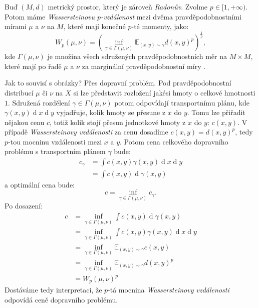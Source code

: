 \documentclass[czech]{article}
\begin{document}
Buď $(M, d)$ metrický prostor, který je zároveň \emph{Radonův}. Zvolme $p \in [1, + \infty)$.
Potom máme \emph{Wassersteinovu $p$-vzdálenost} mezi dvěma pravděpodobnostními mírami $\mu$ a $\nu$ na $M$,
které mají konečné $p$-té momenty,
jako:
\begin{equation}
    W_p (\mu, \nu) = \left( \inf_{\gamma \in \Gamma(\mu, \nu)} \mathbb{E}_{(x, y) \sim \gamma} d(x, y)^p \right)^{\frac{1}{p}},
\end{equation}
kde $\Gamma(\mu, \nu)$ je množina všech sdružených pravděpodobnostních měr na $M \times M$,
které mají po řadě $\mu$ a $\nu$ za marginální pravděpodobnostní míry \cite{vaserstejn}.

Jak to souvisí s obrázky?
Přes dopravní problém.
Pod pravděpodobnostní distribucí $\mu$ či $\nu$ na $X$ si lze představit rozložení jakési hmoty
o celkové hmotnosti $1$.
Sdružená rozdělení $\gamma \in \Gamma(\mu, \nu)$ potom odpovídají transportnímu plánu,
kde $\gamma(x, y) \operatorname{d}x \operatorname{d}y$
vyjadřuje, kolik hmoty se přesune z $x$ do $y$.
Tomu lze přiřadit nějakou cenu $c$,
totiž kolik stojí přesun jednotkové hmoty z $x$ do $y$: $c(x, y)$.
V případě \emph{Wassersteinovy vzdálenosti}
za cenu dosadíme $c(x, y) = d(x, y)^p$,
tedy $p$-tou mocninu vzdálenosti mezi $x$ a $y$.
Potom cena celkového dopravního problému s transportním plánem $\gamma$ bude:
\begin{align}
    c_\gamma &= \int c(x, y) \gamma(x, y) \operatorname{d}x \operatorname{d}y \\
    &= \int c(x, y) \operatorname{d} \gamma(x, y)
\end{align}
a optimální cena bude:
\begin{equation}
    c = \inf_{\gamma \in \Gamma(\mu, \nu)} c_\gamma.
\end{equation}
Po dosazení:
\begin{align}
    c &= \inf_{\gamma \in \Gamma(\mu, \nu)} \int c(x, y) \operatorname{d} \gamma(x, y) \\
    &= \inf_{\gamma \in \Gamma(\mu, \nu)} \int c(x, y) \gamma(x, y) \operatorname{d}x \operatorname{d}y \\
    &= \inf_{\gamma \in \Gamma(\mu, \nu)} \mathbb{E}_{(x, y) \sim \gamma} c(x, y) \\
    &= \inf_{\gamma \in \Gamma(\mu, \nu)} \mathbb{E}_{(x, y) \sim \gamma} d(x, y)^p \\
    &= W_p (\mu, \nu)^p
\end{align}
Dostáváme tedy interpretaci, že $p$-tá mocnina \emph{Wassersteinovy vzdálenosti}
odpovídá ceně dopravního problému.
\end{document}

